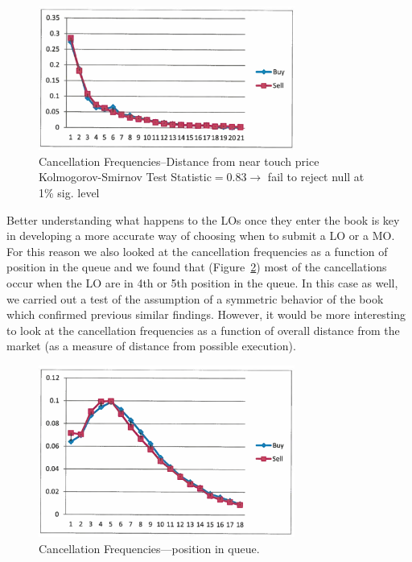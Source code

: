 	\begin{figure}[!ht]
   	\centering
   	\includegraphics[width=0.75\textwidth]{chapters/chapter_trade_data_models/figures/canfreqnear.png} 
   	\caption{Cancellation Frequencies--Distance from near touch price \\ Kolmogorov-Smirnov Test Statistic$=0.83\to$ fail to reject null at 1\% sig. level \label{fig:canfreqnear}}
	\end{figure}


Better understanding what happens to the LOs once they enter the book is key in developing a more accurate way of choosing when to submit a LO or a MO. For this reason we also looked at the cancellation frequencies as a function of position in the queue and we found that (Figure~\ref{fig:canfreq}) most of the cancellations occur when the LO are in 4th or 5th position in the queue. In this case as well, we carried out a test of the assumption of a symmetric behavior of the book which confirmed previous similar findings. However, it would be more interesting to look at the cancellation frequencies as a function of overall distance from the market (as a measure of distance from possible execution). 
	\begin{figure}[!ht]
   	\centering
   	\includegraphics[width=0.75\textwidth]{chapters/chapter_trade_data_models/figures/canfreq.png} 
   	\caption{Cancellation Frequencies---position in queue. \label{fig:canfreq}}
	\end{figure}


